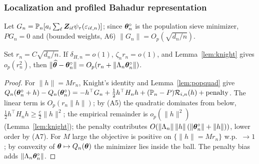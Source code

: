 \subsubsection{Localization and profiled Bahadur representation}
Let $G_n=\mathbb{P}_n[a_i\sum_\ell\bm{Z}_{i\ell}\psi_\tau(\varepsilon_{i\ell,n})]$; since
$\bm{\theta}_n^\circ$ is the population sieve minimizer, $PG_n=0$ and (bounded weights,
A6) $\|G_n\|=O_p(\sqrt{d_n/n})$.

\begin{lemma}[Localization]\label{lem:loc}
Set $r_n=C\sqrt{d_n/n}$. If $\delta_{H,n}=o(1)$, $\zeta_n r_n=o(1)$, and
Lemma~\ref{lem:knight} gives $o_p(r_n^2)$, then
$\|\widehat{\bm{\theta}}-\bm{\theta}_n^\circ\|=O_p(r_n+\|\Lambda_n\bm{\theta}_n^\circ\|)$.
\end{lemma}
\begin{proof}
For $\|h\|=Mr_n$, Knight's identity and Lemma~\ref{lem:popquad} give
$Q_n(\bm{\theta}_n^\circ+h)-Q_n(\bm{\theta}_n^\circ)=-h^\top G_n+\tfrac12 h^\top H_n h
+(\mathbb{P}_n-P)\mathcal R_{i,n}(h)+\text{penalty}$. The linear term is $O_p(r_n\|h\|)$;
by (A5) the quadratic dominates from below, $\tfrac12 h^\top H_n h\ge
\tfrac{\underline c}{2}\|h\|^2$; the empirical remainder is $o_p(\|h\|^2)$
(Lemma~\ref{lem:knight}); the penalty contributes $O(\|\Lambda_n\|\,\|h\|\,
(\|\bm{\theta}_n^\circ\|+\|h\|))$, lower order by (A7). For $M$ large the objective is
positive on $\{\|h\|=Mr_n\}$ w.p.\ $\to1$; by convexity of
$\bm{\theta}\mapsto Q_n(\bm{\theta})$ the minimizer lies inside the ball. The penalty bias adds
$\|\Lambda_n\bm{\theta}_n^\circ\|$.
\end{proof}

